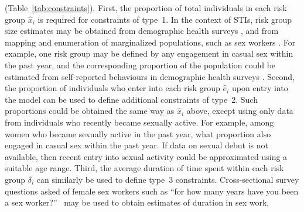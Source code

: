 (Table~\ref{tab:constraints}).
First, the proportion of total individuals in each risk group $\hat{x}_i$ is required
for constraints of type~1.
In the context of STIs, risk group size estimates may be obtained from
demographic health surveys \citep{DHS}, and from
mapping and enumeration of marginalized populations,
such as sex workers \citep{Abdul-Quader2014}.
For example, one risk group may be defined by
any engagement in casual sex within the past year,
and the corresponding proportion of the population
could be estimated from self-reported behaviours
in demographic health surveys \citep{DHS}.
Second, the proportion of individuals who enter into each risk group $\hat{e}_i$
upon entry into the model can be used to define additional constraints of type~2.
Such proportions could be obtained the same way as $\hat{x}_i$ above,
except using only data from individuals who recently became sexually active.
For example, among women who became sexually active in the past year,
what proportion also engaged in casual sex within the past year.
If data on sexual debut is not available,
then recent entry into sexual activity could be approximated using
a suitable age range.
Third, the average duration of time spent within each risk group $\delta_i$
can similarly be used to define type~3 constraints.
Cross-sectional survey questions asked of female sex workers such as
``for how many years have you been a sex worker?''\ %
may be used to obtain estimates of duration in sex work,
